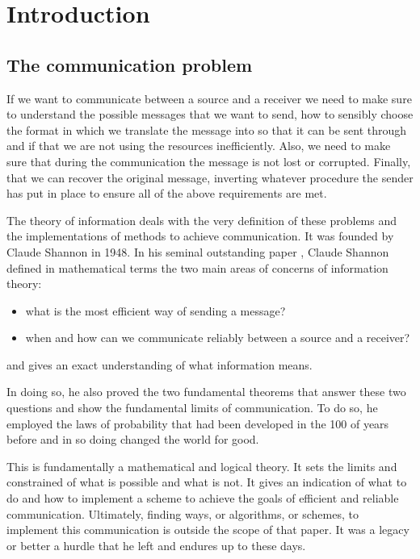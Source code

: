 
\chapter*{Introduction}

\section*{The communication problem}

If we want to communicate between a source and a receiver we need to make sure to understand the possible messages that we want to send, how to sensibly choose the format in which we translate the message into so that it can be sent through and if that we are not using the resources inefficiently. Also, we need to make sure that during the communication the message is not lost or corrupted. Finally, that we can recover the original message, inverting whatever procedure the sender has put in place to ensure all of the above requirements are met.

The theory of information deals with the very definition of these problems and the implementations of methods to achieve communication. It was founded by Claude Shannon in 1948. In his seminal outstanding paper \cite{shannon}, Claude Shannon defined in mathematical terms the two main areas of concerns of information theory:
\begin{itemize}
	\item what is the most efficient way of sending a message?
	\item when and how can we communicate reliably between a source and a receiver?
\end{itemize}
and gives an exact understanding of what information means.

In doing so, he also proved the two fundamental theorems that answer these two questions and show the fundamental limits of communication.  To do so, he employed the laws of probability that had been developed in the 100 of years before and in so doing changed the world for good.

This is fundamentally a mathematical and logical theory. It sets the limits and constrained of what is possible and what is not. It gives an indication of what to do and how to implement a scheme to achieve the goals of efficient and reliable  communication. Ultimately, finding ways, or algorithms, or schemes, to implement this communication is outside the scope of that paper. It was a legacy or better a hurdle that he left and endures up to these days.


